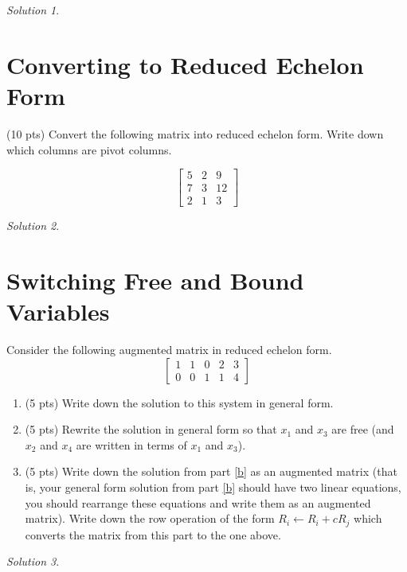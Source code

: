\documentclass{article}
\theoremstyle{remark}
\newtheorem*{solution}{Solution}
\begin{document}
\begin{solution}
\end{solution}

\pagebreak
\section{Converting to Reduced Echelon Form}

(10 pts) Convert the following matrix into reduced echelon form.
Write down which columns are pivot columns.

\begin{displaymath}
  \begin{bmatrix}
    5 & 2 & 9 \\
    7 & 3 & 12 \\
    2 & 1 & 3
  \end{bmatrix}
\end{displaymath}

\begin{solution}
\end{solution}

\pagebreak
\section{Switching Free and Bound Variables}
Consider the following augmented matrix in reduced echelon form.
\begin{displaymath}
  \begin{bmatrix}
    1 & 1 & 0 & 2 & 3 \\
    0 & 0 & 1 & 1 & 4
  \end{bmatrix}
\end{displaymath}
\begin{enumerate}
\item (5 pts) Write down the solution to this system in general form.
\item\label{b} (5 pts) Rewrite the solution in general form so that $x_1$ and $x_3$ are free (and $x_2$ and $x_4$ are written in terms of $x_1$ and $x_3$).
\item\label{c} (5 pts) Write down the solution from part \ref{b} as an augmented matrix (that is, your general form solution from part \ref{b} should have two linear equations, you should rearrange these equations and write them as an augmented matrix).
  Write down the row operation of the form $R_i \gets R_i + cR_j$ which converts the matrix from this part to the one above.
\end{enumerate}

\begin{solution}
\end{solution}
\end{document}
